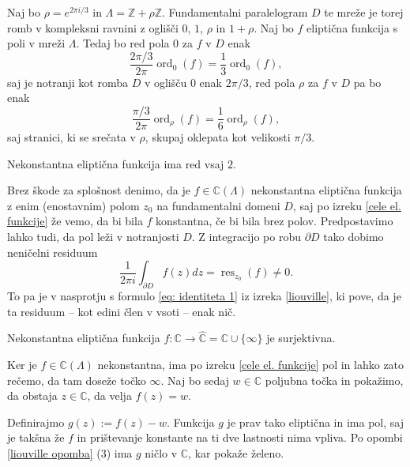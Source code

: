 \documentclass[mat1]{fmfdelo}
\numberwithin{equation}{section}
\newcommand{\Z}{\mathbb Z}
\newcommand{\C}{\mathbb C}
\newcommand{\RS}{\widehat{\C}}
\newcommand{\elf}{\C(\Lambda)}
\newcommand{\res}[2]{\operatorname{res}_{#1}(#2)}
\newcommand{\ord}[2]{\operatorname{ord}_{#1}(#2)}
\theoremstyle{definition}
\begin{document}
\begin{zgled*}
    Naj bo $\rho = e^{2\pi i /3}$ in $\Lambda = \Z + \rho\Z$. Fundamentalni paralelogram $D$ te mreže je torej romb v kompleksni ravnini z oglišči $0$, $1$, $\rho$ in $1 + \rho$. Naj bo $f$ eliptična funkcija s poli v mreži $\Lambda$. Tedaj bo red pola $0$ za $f$ v $D$ enak
    \[
        \frac{2\pi/3}{2\pi}\ord{0}{f} = \frac{1}{3}\ord{0}{f},
    \]
    saj je notranji kot romba $D$ v oglišču $0$ enak $2\pi/3$, red pola $\rho$ za $f$ v $D$ pa bo enak
    \[
        \frac{\pi/3}{2\pi}\ord{\rho}{f} = \frac{1}{6}\ord{\rho}{f},
    \]
    saj stranici, ki se srečata v $\rho$, skupaj oklepata kot velikosti $\pi/3$.
\end{zgled*}

\begin{posledica}
    \label{poseldica o redu elipticne funkcije}
    Nekonstantna eliptična funkcija ima red vsaj $2$.
\end{posledica}

\begin{dokaz}
    Brez škode za splošnost denimo, da je $f \in \elf$ nekonstantna eliptična funkcija z enim (enostavnim) polom $z_0$ na fundamentalni domeni $D$, saj po izreku \ref{cele el. funkcije} že vemo, da bi bila $f$ konstantna, če bi bila brez polov. 
    Predpostavimo lahko tudi, da pol leži v notranjosti $D$. Z integracijo po robu $\partial D$ tako dobimo neničelni residuum
    \[
        \frac{1}{2 \pi i} \int_{\partial D} f(z)dz = \res{z_0}{f} \neq 0.  
    \]
    To pa je v nasprotju s formulo \eqref{eq: identiteta 1} iz izreka \ref{liouville}, ki pove, da je ta residuum -- kot edini člen v vsoti -- enak nič. 
\end{dokaz}

\begin{posledica}
    \label{elipticna funkcija je surjektivna}
    Nekonstantna eliptična funkcija $f: \C \to \RS = \C \cup \{\infty\}$ je surjektivna. 
\end{posledica}

\begin{dokaz}
    Ker je $f \in \elf$ nekonstantna, ima po izreku \ref{cele el. funkcije} pol in lahko zato rečemo, da tam doseže točko $\infty$. Naj bo sedaj $w \in \C$ poljubna točka in pokažimo, da obstaja $z \in \C$, da velja $f(z) = w$.
    
    Definirajmo $g(z) := f(z) - w$. Funkcija $g$ je prav tako eliptična in ima pol, saj je takšna že $f$ in prištevanje konstante na ti dve lastnosti nima vpliva. Po opombi \ref{liouville opomba} (3) ima $g$ ničlo v $\C$, kar pokaže želeno.
\end{dokaz}
\end{document}
